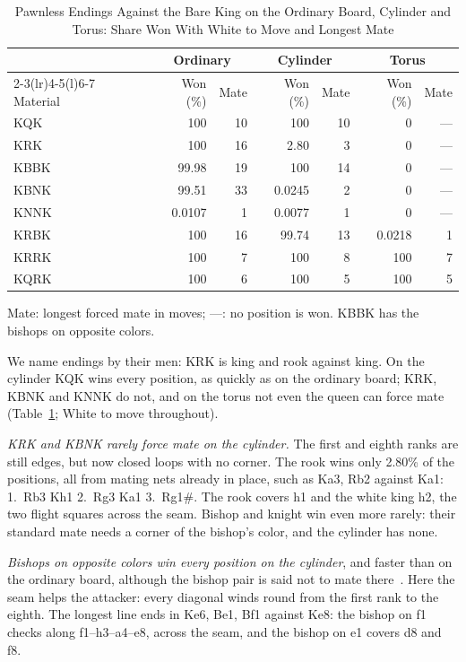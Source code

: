 \begin{table}[!t]
\centering
\caption{Pawnless Endings Against the Bare King on the Ordinary Board, Cylinder and Torus: Share Won With
White to Move and Longest Mate }
\label{tab:tb}
\footnotesize
\setlength{\tabcolsep}{4.5pt}
\begin{tabular}{@{}lrrrrrr@{}}
\toprule
& \multicolumn{2}{c}{Ordinary} & \multicolumn{2}{c}{Cylinder} & \multicolumn{2}{c}{Torus} \\
\cmidrule(lr){2-3}\cmidrule(lr){4-5}\cmidrule(l){6-7}
Material & Won (\%) & Mate & Won (\%) & Mate & Won (\%) & Mate \\
\midrule
KQK  & 100    & 10 & 100    & 10 & 0      & --- \\
KRK  & 100    & 16 & 2.80   & 3  & 0      & --- \\
KBBK & 99.98  & 19 & 100    & 14 & 0      & --- \\
KBNK & 99.51  & 33 & 0.0245 & 2  & 0      & --- \\
KNNK & 0.0107 & 1  & 0.0077 & 1  & 0      & --- \\
KRBK & 100    & 16 & 99.74  & 13 & 0.0218 & 1   \\
KRRK & 100    & 7  & 100    & 8  & 100    & 7   \\
KQRK & 100    & 6  & 100    & 5  & 100    & 5   \\
\bottomrule
\end{tabular}

\smallskip
\parbox{\columnwidth}{\footnotesize Mate: longest forced mate in moves; ---: no position is won. KBBK has
the bishops on opposite colors.}
\end{table}

We name endings by their men: KRK is king and rook against king. On the cylinder KQK wins every position, as quickly as on the ordinary board; KRK, KBNK and KNNK do not, and
on the torus not even the queen can force mate (Table~\ref{tab:tb}; White to move throughout).

\emph{KRK and KBNK rarely force mate on the cylinder.} The first and eighth ranks are still edges, but now
closed loops with no corner. The rook wins only 2.80\% of the positions, all from mating nets already
in place, such as Ka3, Rb2 against Ka1: 1.~Rb3 Kh1 2.~Rg3 Ka1 3.~Rg1\#. The rook covers h1 and the
white king h2, the two flight squares across the seam. Bishop and knight win even more rarely: their standard mate
needs a corner of the bishop's color, and the cylinder has none.

\emph{Bishops on opposite colors win every position on the cylinder}, and faster than on the ordinary board,
although the bishop pair is said not to mate there~\cite{HGMCylinder}.
Here the seam helps the attacker: every diagonal winds round from the first rank to the eighth. The longest
line ends in Ke6, Be1, Bf1 against Ke8: the bishop on f1 checks along f1--h3--a4--e8, across the seam, and
the bishop on e1 covers d8 and f8.

